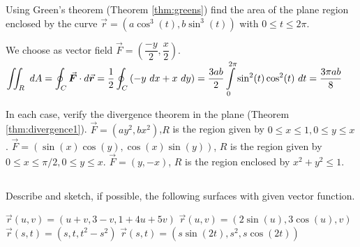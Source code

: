 \begin{Exercise}[difficulty = 3] Using Green's theorem (Theorem \ref{thm:greens}) find the area of the plane region enclosed by the curve $\vec r = \left(a \cos^3 (t), b \sin^3 (t)  \right)$ with $0 \leq t \leq 2\pi$. %
\end{Exercise}

\begin{Answer}
    We choose as vector field $\vec F = \left(\dfrac{-y}{2}, \dfrac{x}{2}\right)$. \\[0.2cm]
    $\ds \iint_R \ dA = \ds \oint_C \vec F\cdot d\vec r = \dfrac{1}{2} \ds \oint_C \left( -y \ dx + x \ dy \right) = \dfrac{3ab}{2} \ds \int\limits_0^{2\pi} \sin^2(t) \cos^2(t) \ dt= \dfrac{3 \pi ab}{8} $
\end{Answer}


\begin{Exercise} In each case, verify the divergence theorem in the plane (Theorem \ref{thm:divergence1}).
	\Question $\vec F = \left(a y^2, bx^2  \right)$,\quad $R$ is the region given by $0 \leq x \leq 1, 0 \leq y \leq x$.
	\Question $\vec F = \left(\sin (x) \cos (y), \cos (x) \sin (y)\right)$, \quad $R$ is the region given by $0 \leq x \leq \pi/2, 0 \leq y \leq x$.
	\Question $\vec F = \left(y, -x \right)$, \quad $R$ is the region enclosed by $x^2+y^2\leq 1$.
\end{Exercise}

\begin{Answer}

\end{Answer}


\subsection*{}
\begin{Exercise} Describe and sketch, if possible, the following surfaces with given vector function.
\begin{multicols}{2}
		\Question $\vec r (u,v) = \left(u+v, 3-v,1+4u+5v  \right)$
		\Question $\vec r (u,v) = \left(2 \sin (u), 3 \cos (u), v  \right)$
		\Question $\vec r (s,t) = \left(s,t,t^2-s^2 \right)$
		\Question $\vec r (s,t) = \left(s \sin (2t), s^2, s \cos (2t)  \right)$
		\EndCurrentQuestion
\end{multicols}
\end{Exercise}

